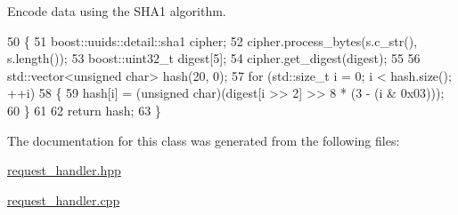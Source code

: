 Encode data using the S\+H\+A1 algorithm. 


\begin{DoxyCode}
50         \{
51             boost::uuids::detail::sha1 cipher;
52             cipher.process\_bytes(s.c\_str(), s.length());
53             boost::uint32\_t digest[5];
54             cipher.get\_digest(digest);
55 
56             std::vector<unsigned char> hash(20, 0);
57             \textcolor{keywordflow}{for} (std::size\_t i = 0; i < hash.size(); ++i)
58             \{
59                 hash[i] = (\textcolor{keywordtype}{unsigned} char)(digest[i >> 2] >> 8 * (3 - (i & 0x03)));
60             \}
61 
62             \textcolor{keywordflow}{return} hash;
63         \}
\end{DoxyCode}


The documentation for this class was generated from the following files\+:\begin{DoxyCompactItemize}
\item 
\hyperlink{request__handler_8hpp}{request\+\_\+handler.\+hpp}\item 
\hyperlink{request__handler_8cpp}{request\+\_\+handler.\+cpp}\end{DoxyCompactItemize}
